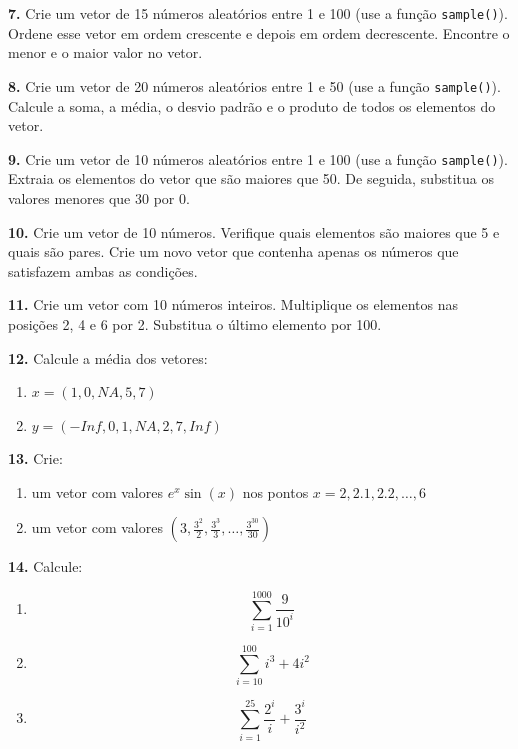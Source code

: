 \documentclass[
]{book}
\providecommand{\tightlist}{%
  \setlength{\itemsep}{0pt}\setlength{\parskip}{0pt}}
\begin{document}
\textbf{7.} Crie um vetor de 15 números aleatórios entre 1 e 100 (use a
função \texttt{sample()}). Ordene esse vetor em ordem crescente e depois em
ordem decrescente. Encontre o menor e o maior valor no vetor.

\textbf{8.} Crie um vetor de 20 números aleatórios entre 1 e 50 (use a função
\texttt{sample()}). Calcule a soma, a média, o desvio padrão e o produto de
todos os elementos do vetor.

\textbf{9.} Crie um vetor de 10 números aleatórios entre 1 e 100 (use a
função \texttt{sample()}). Extraia os elementos do vetor que são maiores que
50. De seguida, substitua os valores menores que 30 por 0.

\textbf{10.} Crie um vetor de 10 números. Verifique quais elementos são
maiores que 5 e quais são pares. Crie um novo vetor que contenha apenas
os números que satisfazem ambas as condições.

\textbf{11.} Crie um vetor com 10 números inteiros. Multiplique os elementos
nas posições 2, 4 e 6 por 2. Substitua o último elemento por 100.

\textbf{12.} Calcule a média dos vetores:

\begin{enumerate}
\def\labelenumi{(\alph{enumi})}
\item
  \(x = (1,0,NA, 5,7)\)
\item
  \(y = (-Inf,0,1,NA,2,7,Inf)\)
\end{enumerate}

\textbf{13.} Crie:

\begin{enumerate}
\def\labelenumi{(\alph{enumi})}
\item
  um vetor com valores \(e^{x} \sin(x)\) nos pontos
  \(x=2,2.1,2.2,\ldots,6\)
\item
  um vetor com valores
  \(\left(3,\frac{3^2}{2},\frac{3^3}{3},\ldots,\frac{3^{30}}{30}\right)\)
\end{enumerate}

\textbf{14.} Calcule:

\begin{enumerate}
\def\labelenumi{(\alph{enumi})}
\tightlist
\item
  \[\sum_{i=1}^{1000}\frac{9}{10^{i}}\]
\item
  \[\sum_{i=10}^{100}i^{3}+4i^{2}\]
\item
  \[\sum_{i=1}^{25}\frac{2^{i}}{i} + \frac{3^{i}}{i^2}\]
\end{enumerate}
\end{document}
